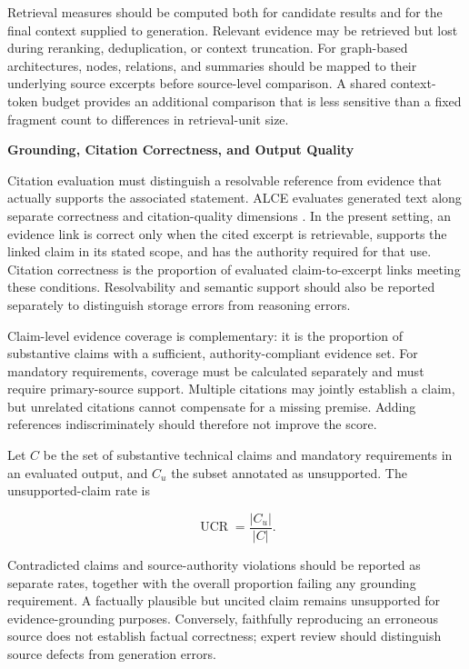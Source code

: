\documentclass[12pt,a4paper]{report}
\numberwithin{equation}{chapter}
\begin{document}
Retrieval measures should be computed both for candidate results and for the final context supplied to generation. Relevant evidence may be retrieved but lost during reranking, deduplication, or context truncation. For graph-based architectures, nodes, relations, and summaries should be mapped to their underlying source excerpts before source-level comparison. A shared context-token budget provides an additional comparison that is less sensitive than a fixed fragment count to differences in retrieval-unit size.

\par\medskip
\textbf{Grounding, Citation Correctness, and Output Quality}

Citation evaluation must distinguish a resolvable reference from evidence that actually supports the associated statement. ALCE evaluates generated text along separate correctness and citation-quality dimensions \cite{Gao2023}. In the present setting, an evidence link is correct only when the cited excerpt is retrievable, supports the linked claim in its stated scope, and has the authority required for that use. Citation correctness is the proportion of evaluated claim-to-excerpt links meeting these conditions. Resolvability and semantic support should also be reported separately to distinguish storage errors from reasoning errors.

Claim-level evidence coverage is complementary: it is the proportion of substantive claims with a sufficient, authority-compliant evidence set. For mandatory requirements, coverage must be calculated separately and must require primary-source support. Multiple citations may jointly establish a claim, but unrelated citations cannot compensate for a missing premise. Adding references indiscriminately should therefore not improve the score.

Let \(C\) be the set of substantive technical claims and mandatory requirements in an evaluated output, and \(C_u\) the subset annotated as unsupported. The unsupported-claim rate is

\begin{equation}
\label{eq:unsupported-claim-rate}
\operatorname{UCR}=\frac{|C_u|}{|C|}.
\end{equation}

Contradicted claims and source-authority violations should be reported as separate rates, together with the overall proportion failing any grounding requirement. A factually plausible but uncited claim remains unsupported for evidence-grounding purposes. Conversely, faithfully reproducing an erroneous source does not establish factual correctness; expert review should distinguish source defects from generation errors.
\end{document}
